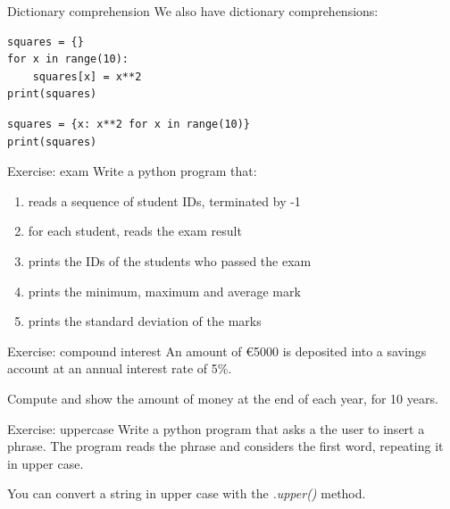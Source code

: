 \documentclass[aspectratio=169,]{beamer}
\begin{document}
\begin{frame}[fragile]{Dictionary comprehension}
    We also have dictionary comprehensions:

    \begin{minipage}{0.49\textwidth}
    \begin{verbatim}
squares = {}
for x in range(10):
    squares[x] = x**2
print(squares)
    \end{verbatim}
    \end{minipage}
    \begin{minipage}{0.49\textwidth}
    \begin{verbatim}
squares = {x: x**2 for x in range(10)}
print(squares)
    \end{verbatim}
    \end{minipage}
\end{frame}

\begin{frame}{Exercise: exam}
    Write a python program that:
    \begin{enumerate}
        \item reads a sequence of student IDs, terminated by -1
        \item for each student, reads the exam result
        \item prints the IDs of the students who passed the exam
        \item prints the minimum, maximum and average mark
        \item prints the standard deviation of the marks
    \end{enumerate}
\end{frame}

\begin{frame}{Exercise: compound interest}
    An amount of \euro5000 is deposited into a savings account at an annual interest rate of 5\%.

    Compute and show the amount of money at the end of each year, for 10 years.
\end{frame}

\begin{frame}{Exercise: uppercase}
    Write a python program that asks a the user to insert a phrase.
    The program reads the phrase and considers the first word, repeating it in upper case.

    You can convert a string in upper case with the \emph{.upper()} method.
\end{frame}
\end{document}
